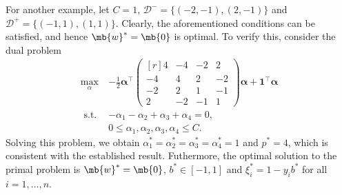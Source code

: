 \begin{exercise}
\begin{enumerate}
\begin{solution}
\begin{enumerate}
                        For another example, let $C = 1$, $\mathcal{D}^- = \{(-2,-1), (2,-1)\}$ and $\mathcal{D}^+ = \{(-1,1), (1,1)\}$. Clearly, the aforementioned conditions can be satisfied, and hence $\mb{w}^* = \mb{0}$ is optimal. To verify this, consider the dual problem
                        \begin{align*}
                            \max_{\alpha} \  & -\frac{1}{2} \bm{\alpha}^\top
                            \begin{pmatrix*}[r]
                                4  & -4 & -2 & 2  \\
                                -4 & 4  & 2  & -2 \\
                                -2 & 2  & 1  & -1 \\
                                2  & -2 & -1 & 1
                            \end{pmatrix*}
                            \bm{\alpha} + \bm{1}^\top \bm{\alpha}                                  \\
                            \text{ s.t. }    & -\alpha_1 - \alpha_2 + \alpha_3 + \alpha_4 = 0,     \\
                                             & 0 \le \alpha_1, \alpha_2, \alpha_3, \alpha_4 \le C.
                        \end{align*}
                        Solving this problem, we obtain $\alpha_1^* = \alpha_2^* = \alpha_3^* = \alpha_4^* = 1$ and $p^* = 4$, which is consistent with the established result. Futhermore, the optimal solution to the primal problem is $\mb{w}^* = \mb{0}$, $b^* \in [-1,1]$ and $\xi_i^* = 1-y_i b^*$ for all $i=1,\ldots,n$. \qedhere
                \end{enumerate}
            \end{solution}


    \end{enumerate}
\end{exercise}
\clearpage




